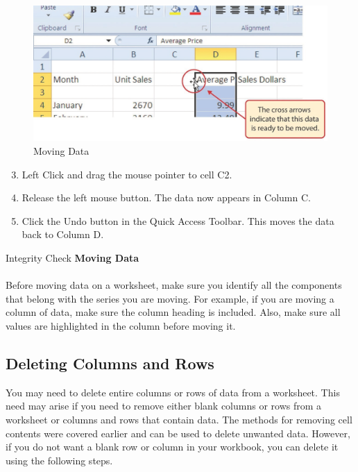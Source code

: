 \begin{figure}[H]
	\centering
	\includegraphics[width=\maxwidth{.95\linewidth}]{gfx/ch01_fig30}
	\caption{Moving Data}
	\label{01:fig30}
\end{figure}

\begin{enumerate}
	\setcounter{enumi}{2}
	
	\item Left Click and drag the mouse pointer to cell \textsf{C2}.
	\item Release the left mouse button. The data now appears in Column \textsf{C}.
	\item Click the Undo button in the Quick Access Toolbar. This moves the data back to Column \textsf{D}.
\end{enumerate}

\begin{center}
	\begin{infobox}{Integrity Check}
		\textbf{Moving Data}
		\\
		\\
		Before moving data on a worksheet, make sure you identify all the components that belong with the series you are moving. For example, if you are moving a column of data, make sure the column heading is included. Also, make sure all values are highlighted in the column before moving it.
	\end{infobox}
\end{center}


\subsection{Deleting Columns and Rows}

You may need to delete entire columns or rows of data from a worksheet. This need may arise if you need to remove either blank columns or rows from a worksheet or columns and rows that contain data. The methods for removing cell contents were covered earlier and can be used to delete unwanted data. However, if you do not want a blank row or column in your workbook, you can delete it using the following steps.

